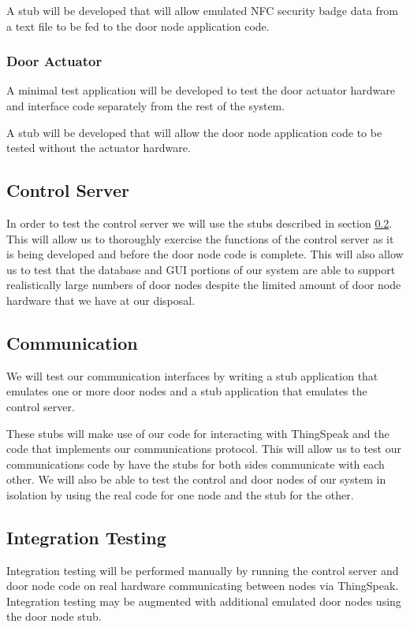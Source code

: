 A stub will be developed that will allow emulated NFC security badge data from a text file
to be fed to the door node application code.

\subsubsection{Door Actuator}

A minimal test application will be developed to test the door actuator hardware
and interface code separately from the rest of the system.

A stub will be developed that will allow the door node application code to be
tested without the actuator hardware.

\subsection{Control Server}

In order to test the control server we will use the stubs described in section
\ref{subsec:testing-communication}. This will allow us to thoroughly
exercise the functions of the control server as it is being developed and before
the door node code is complete. This will also allow us to test that the
database and GUI portions of our system are able to support realistically large
numbers of door nodes despite the limited amount of door node hardware that we
have at our disposal.

\subsection{Communication}
\label{subsec:testing-communication}

We will test our communication interfaces by writing a stub application that
emulates one or more door nodes and a stub application that emulates the control
server.

These stubs will make use of our code for interacting with ThingSpeak and the
code that implements our communications protocol. This will allow us to test our
communications code by have the stubs for both sides communicate with each
other. We will also be able to test the control and door nodes of our system in
isolation by using the real code for one node and the stub for the other.

\subsection{Integration Testing}

Integration testing will be performed manually by running the control server and
door node code on real hardware communicating between nodes via ThingSpeak.
Integration testing may be augmented with additional emulated door nodes using
the door node stub.
